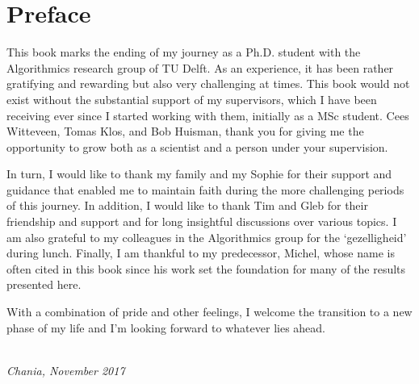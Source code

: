 \chapter*{Preface}

This book marks the ending of my journey as a Ph.D. student with the Algorithmics research group of TU Delft. 
As an experience, it has been rather gratifying and rewarding but also very challenging at times. 
This book would not exist without the substantial support of my supervisors, 
which I have been receiving ever since I started working with them, initially as a MSc student.
Cees Witteveen, Tomas Klos, and Bob Huisman, 
thank you for giving me the opportunity to grow both as a scientist and a person under your supervision.

In turn, I would like to thank my family and my Sophie for their support and 
guidance that enabled me to maintain faith during the more challenging periods of this journey. 
In addition, I would like to thank Tim and Gleb for their friendship and support
and for long insightful discussions over various topics.
I am also grateful to my colleagues in the Algorithmics group for the ‘gezelligheid’ during lunch.
Finally, I am thankful to my predecessor, Michel, 
whose name is often cited in this book since his work set the foundation for many of the results presented here.

With a combination of pride and other feelings, 
I welcome the transition to a new phase of my life and I’m looking forward to whatever lies ahead.
 
\begin{flushright}
{\makeatletter\itshape
    \@firstname\ \@lastname \\
    Chania, November 2017
\makeatother}
\end{flushright}

